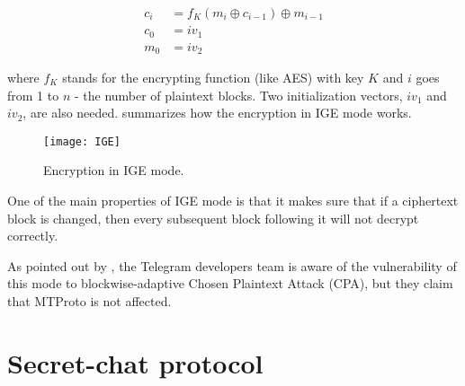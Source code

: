 \begin{equation}
\begin{aligned}
    c_i &= f_K(m_i \oplus c_{i-1}) \oplus m_{i-1} \\
    c_0 &= iv_1 \\
    m_0 &= iv_2 
\end{aligned}
\end{equation}

where $f_K$ stands for the encrypting function (like AES) with key $K$
and $i$ goes from 1 to $n$ - the number of plaintext blocks. Two initialization vectors, $iv_1$ and $iv_2$, are also needed.  summarizes how the encryption in IGE mode works.

\begin{figure}[t]
    \centering
    \texttt{[image: IGE]}
    \caption{Encryption in IGE mode.}
    \label{fig:IGE}
\end{figure}

One of the main properties of IGE mode is that it makes sure that if a ciphertext block is changed, then every subsequent block following it will not decrypt correctly.

As pointed out by \cite{Telegram-AFAQ-IGE}, the Telegram developers team is aware of the vulnerability of this mode to blockwise-adaptive Chosen Plaintext Attack (CPA)\cite{IGE-CPA}, but they claim that MTProto is not affected.




\section{Secret-chat protocol}
\label{sec:secret-chat}

